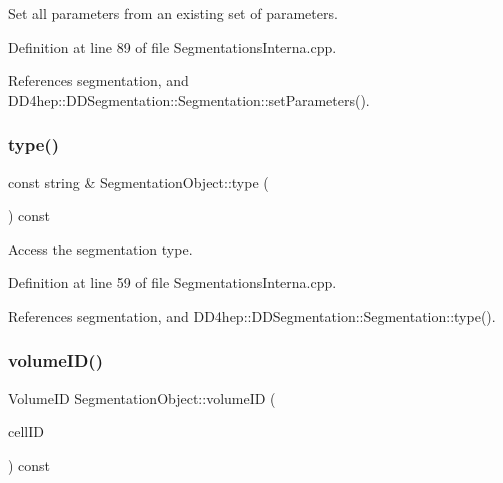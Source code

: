 Set all parameters from an existing set of parameters. 



Definition at line 89 of file Segmentations\+Interna.\+cpp.



References segmentation, and D\+D4hep\+::\+D\+D\+Segmentation\+::\+Segmentation\+::set\+Parameters().

\hypertarget{class_d_d4hep_1_1_geometry_1_1_segmentation_object_a1216616c2dce1fed63142d7ec139aa18}{}\label{class_d_d4hep_1_1_geometry_1_1_segmentation_object_a1216616c2dce1fed63142d7ec139aa18} 
\subsubsection{\texorpdfstring{type()}{type()}}
{\footnotesize\ttfamily const string \& Segmentation\+Object\+::type (\begin{DoxyParamCaption}{ }\end{DoxyParamCaption}) const}



Access the segmentation type. 



Definition at line 59 of file Segmentations\+Interna.\+cpp.



References segmentation, and D\+D4hep\+::\+D\+D\+Segmentation\+::\+Segmentation\+::type().

\hypertarget{class_d_d4hep_1_1_geometry_1_1_segmentation_object_a0a89da9aa8101caea4a069e4cfb2ab6f}{}\label{class_d_d4hep_1_1_geometry_1_1_segmentation_object_a0a89da9aa8101caea4a069e4cfb2ab6f} 
\subsubsection{\texorpdfstring{volume\+I\+D()}{volumeID()}}
{\footnotesize\ttfamily Volume\+ID Segmentation\+Object\+::volume\+ID (\begin{DoxyParamCaption}\item[{const Cell\+ID \&}]{cell\+ID }\end{DoxyParamCaption}) const}



